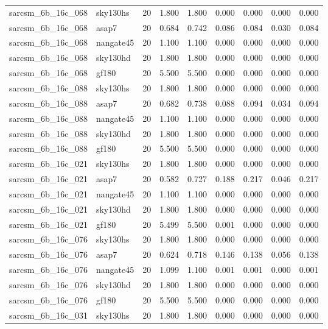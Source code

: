 \begin{tabular}{llrrrrrrr}
sarcsm\_6b\_16c\_068 & sky130hs & 20 & 1.800 & 1.800 & 0.000 & 0.000 & 0.000 & 0.000 \\
sarcsm\_6b\_16c\_068 & asap7 & 20 & 0.684 & 0.742 & 0.086 & 0.084 & 0.030 & 0.084 \\
sarcsm\_6b\_16c\_068 & nangate45 & 20 & 1.100 & 1.100 & 0.000 & 0.000 & 0.000 & 0.000 \\
sarcsm\_6b\_16c\_068 & sky130hd & 20 & 1.800 & 1.800 & 0.000 & 0.000 & 0.000 & 0.000 \\
sarcsm\_6b\_16c\_068 & gf180 & 20 & 5.500 & 5.500 & 0.000 & 0.000 & 0.000 & 0.000 \\
sarcsm\_6b\_16c\_088 & sky130hs & 20 & 1.800 & 1.800 & 0.000 & 0.000 & 0.000 & 0.000 \\
sarcsm\_6b\_16c\_088 & asap7 & 20 & 0.682 & 0.738 & 0.088 & 0.094 & 0.034 & 0.094 \\
sarcsm\_6b\_16c\_088 & nangate45 & 20 & 1.100 & 1.100 & 0.000 & 0.000 & 0.000 & 0.000 \\
sarcsm\_6b\_16c\_088 & sky130hd & 20 & 1.800 & 1.800 & 0.000 & 0.000 & 0.000 & 0.000 \\
sarcsm\_6b\_16c\_088 & gf180 & 20 & 5.500 & 5.500 & 0.000 & 0.000 & 0.000 & 0.000 \\
sarcsm\_6b\_16c\_021 & sky130hs & 20 & 1.800 & 1.800 & 0.000 & 0.000 & 0.000 & 0.000 \\
sarcsm\_6b\_16c\_021 & asap7 & 20 & 0.582 & 0.727 & 0.188 & 0.217 & 0.046 & 0.217 \\
sarcsm\_6b\_16c\_021 & nangate45 & 20 & 1.100 & 1.100 & 0.000 & 0.000 & 0.000 & 0.000 \\
sarcsm\_6b\_16c\_021 & sky130hd & 20 & 1.800 & 1.800 & 0.000 & 0.000 & 0.000 & 0.000 \\
sarcsm\_6b\_16c\_021 & gf180 & 20 & 5.499 & 5.500 & 0.001 & 0.000 & 0.000 & 0.000 \\
sarcsm\_6b\_16c\_076 & sky130hs & 20 & 1.800 & 1.800 & 0.000 & 0.000 & 0.000 & 0.000 \\
sarcsm\_6b\_16c\_076 & asap7 & 20 & 0.624 & 0.718 & 0.146 & 0.138 & 0.056 & 0.138 \\
sarcsm\_6b\_16c\_076 & nangate45 & 20 & 1.099 & 1.100 & 0.001 & 0.001 & 0.000 & 0.001 \\
sarcsm\_6b\_16c\_076 & sky130hd & 20 & 1.800 & 1.800 & 0.000 & 0.000 & 0.000 & 0.000 \\
sarcsm\_6b\_16c\_076 & gf180 & 20 & 5.500 & 5.500 & 0.000 & 0.000 & 0.000 & 0.000 \\
sarcsm\_6b\_16c\_031 & sky130hs & 20 & 1.800 & 1.800 & 0.000 & 0.000 & 0.000 & 0.000 \\

\end{tabular}
